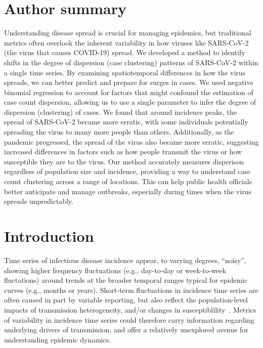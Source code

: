 \documentclass[10pt,letterpaper]{article}
\begin{document}
\section*{Author summary}
Understanding disease spread is crucial for managing epidemics, but traditional metrics often overlook the inherent variability in how viruses like SARS-CoV-2 (the virus that causes COVID-19) spread. 
We developed a method to identify shifts in the degree of dispersion (case clustering) patterns of SARS-CoV-2  within a single time series.
By examining spatiotemporal differences in how the virus spreads, we can better predict and prepare for surges in cases.
We used negative binomial regression to account for factors that might confound the estimation of case count dispersion, allowing us to use a single parameter to infer the degree of dispersion (clustering) of cases. 
We found that around incidence peaks, the spread of SARS-CoV-2 became more erratic, with some individuals potentially spreading the virus to many more people than others. 
Additionally, as the pandemic progressed, the spread of the virus also became more erratic, suggesting increased differences in factors such as how people transmit the virus or how susceptible they are to the virus.
Our method accurately measures disperison regardless of population size and incidence, providing a way to understand case count clustering across a range of locations. 
This can help public health officials better anticipate and manage outbreaks, especially during times when the virus spreads unpredictably.

\linenumbers

\section*{Introduction}
Time series of infectious disease incidence appear, to varying degrees, ``noisy'', showing higher frequency fluctuations (e.g., day-to-day or week-to-week fluctations) around trends at the broader temporal ranges typical for epidemic curves (e.g., months or years).
Short-term fluctuations in incidence time series are often caused in part by variable reporting, but also reflect the population-level impacts of transmission heterogeneity, and/or changes in susceptiblility~\cite{lloyd-smith_superspreading_2005, kirkegaard2021superspreading, sun_transmission_2021,guo2023statistical,ko2023time}.
Metrics of variability in incidence time series could therefore carry information regarding underlying drivers of transmission, and offer a relatively unexplored avenue for understanding epidemic dynamics. 
\end{document}
